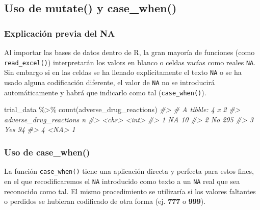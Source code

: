 \documentclass[
]{book}
\newenvironment{Shaded}{\begin{snugshade}}{\end{snugshade}}
\newcommand{\CommentTok}[1]{\textcolor[rgb]{0.56,0.35,0.01}{\textit{#1}}}
\newcommand{\FunctionTok}[1]{\textcolor[rgb]{0.00,0.00,0.00}{#1}}
\newcommand{\NormalTok}[1]{#1}
\newcommand{\SpecialCharTok}[1]{\textcolor[rgb]{0.00,0.00,0.00}{#1}}
\begin{document}
\hypertarget{uso-de-mutate-y-case_when}{%
\subsection{Uso de mutate() y case\_when()}\label{uso-de-mutate-y-case_when}}

\hypertarget{explicaciuxf3n-previa-del-na}{%
\subsubsection{Explicación previa del NA}\label{explicaciuxf3n-previa-del-na}}

Al importar las bases de datos dentro de R, la gran mayoría de funciones (como \texttt{read\_excel()}) interpretarán los valors en blanco o celdas vacías como reales \texttt{NA}. Sin embargo si en las celdas se ha llenado explícitamente el texto \texttt{NA} o se ha usado alguna codificación diferente, el valor de \texttt{NA} no se introducirá automáticamente y habrá que indicarlo como tal (\texttt{case\_when()}).

\begin{Shaded}
\begin{Highlighting}[]
\NormalTok{trial\_data }\SpecialCharTok{\%\textgreater{}\%} 
  \FunctionTok{count}\NormalTok{(adverse\_drug\_reactions)}
\CommentTok{\#\textgreater{} \# A tibble: 4 x 2}
\CommentTok{\#\textgreater{}   adverse\_drug\_reactions     n}
\CommentTok{\#\textgreater{}   \textless{}chr\textgreater{}                  \textless{}int\textgreater{}}
\CommentTok{\#\textgreater{} 1 NA                        10}
\CommentTok{\#\textgreater{} 2 No                       295}
\CommentTok{\#\textgreater{} 3 Yes                       94}
\CommentTok{\#\textgreater{} 4 \textless{}NA\textgreater{}                       1}
\end{Highlighting}
\end{Shaded}

\hypertarget{uso-de-case_when}{%
\subsubsection{Uso de case\_when()}\label{uso-de-case_when}}

La función \texttt{case\_when()} tiene una aplicación directa y perfecta para estos fines, en el que recodificaremos el \texttt{NA} introducido como texto a un \texttt{NA} real que sea reconocido como tal. El mismo procedimiento se utilizaría si los valores faltantes o perdidos se hubieran codificado de otra forma (ej. \textbf{777} o \textbf{999}).
\end{document}
